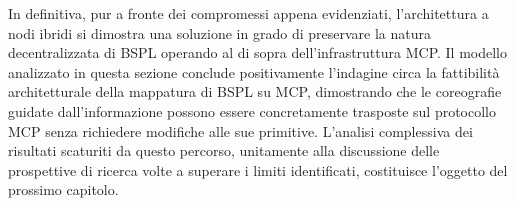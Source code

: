In definitiva, pur a fronte dei compromessi appena evidenziati, l'architettura a nodi ibridi si dimostra una soluzione in grado di preservare la natura decentralizzata di BSPL operando al di sopra dell'infrastruttura MCP. 
Il modello analizzato in questa sezione conclude positivamente l'indagine circa la fattibilità architetturale della mappatura di BSPL su MCP, dimostrando che le coreografie guidate dall'informazione possono essere concretamente trasposte sul protocollo MCP senza richiedere modifiche alle sue primitive. 
L'analisi complessiva dei risultati scaturiti da questo percorso, unitamente alla discussione delle prospettive di ricerca volte a superare i limiti identificati, costituisce l'oggetto del prossimo capitolo.